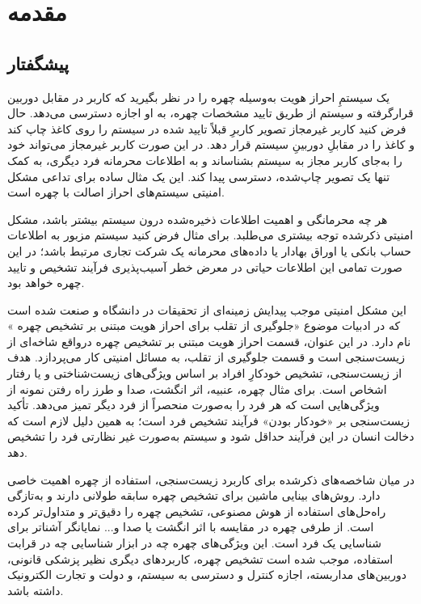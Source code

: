 
\chapter{مقدمه}
\thispagestyle{empty}
\section{پیشگفتار}
یک سیستمِ احراز هویت به‌وسیله چهره را در نظر بگیرید که کاربر در مقابل دوربین قرار‌گرفته و سیستم از طریق تایید مشخصات چهره، به او اجازه دسترسی می‌دهد. حال فرض کنید کاربر غیر‌مجاز تصویر کاربرِ قبلاً تایید شده در سیستم را روی کاغذ چاپ کند و کاغذ را در مقابلِ دوربینِ سیستم قرار دهد. در این صورت کاربر غیر‌مجاز می‌تواند خود را به‌جای کاربر مجاز به سیستم بشناساند و به اطلاعات محرمانه فرد دیگری، به کمک تنها یک تصویر چاپ‌شده، دسترسی پیدا کند. این یک مثال ساده برای تداعی مشکل امنیتی سیستم‌های احراز اصالت با چهره است.

هر چه محرمانگی و اهمیت اطلاعات ذخیره‌شده درون سیستم بیشتر باشد، مشکل امنیتی ذکر‌شده توجه بیشتری می‌طلبد. برای مثال فرض کنید سیستم مزبور به اطلاعات حساب بانکی یا اوراق بهادار یا داده‌های محرمانه یک شرکت تجاری مرتبط باشد؛ در این صورت تمامی این اطلاعات حیاتی در معرض خطر آسیب‌پذیری فرآیند تشخیص و تایید چهره خواهد بود.

این مشکل امنیتی موجب پیدایش زمینه‌ای از تحقیقات در دانشگاه و صنعت شده است که در ادبیات موضوع «جلوگیری از تقلب برای احراز هویت مبتنی بر تشخیص چهره
» نام دارد. در این عنوان، قسمت احراز هویت مبتنی بر تشخیص چهره در‌واقع شاخه‌ای از زیست‌سنجی
   است و قسمت جلوگیری از تقلب، به مسائل امنیتی کار می‌پردازد.
هدف از زیست‌سنجی، تشخیص خودکارِ افراد بر اساس ویژگی‌های زیست‌شناختی و یا رفتار اشخاص است. برای مثال چهره، عنبیه، اثر انگشت، صدا و طرز راه رفتن نمونه از ویژگی‌هایی است که هر فرد را به‌صورت منحصراً از فرد دیگر تمیز می‌دهد.  تأکید زیست‌سنجی بر «خودکار بودن» فرآیند تشخیص فرد است؛ به همین دلیل لازم است که دخالت انسان در این فرآیند حداقل شود و سیستم به‌صورت غیر نظارتی
 فرد را تشخیص دهد.
 
در میان شاخصه‌های ذکر‌شده برای کاربرد زیست‌سنجی، استفاده از چهره اهمیت خاصی دارد. روش‌های بینایی ماشین برای تشخیص چهره سابقه طولانی دارند و به‌تازگی راه‌حل‌های استفاده از هوش مصنوعی، تشخیص چهره را دقیق‌تر و متداول‌تر کرده است. از طرفی چهره در مقایسه با اثر انگشت یا صدا و... نمایانگر آشناتر برای شناسایی یک فرد است. این ویژگی‌های چهره چه در ابزار شناسایی چه در قرابت استفاده، موجب شده است تشخیص چهره، کاربردهای دیگری نظیر پزشکی قانونی، دوربین‌های مداربسته، اجازه کنترل و دسترسی به سیستم، و دولت و تجارت الکترونیک داشته باشد.

